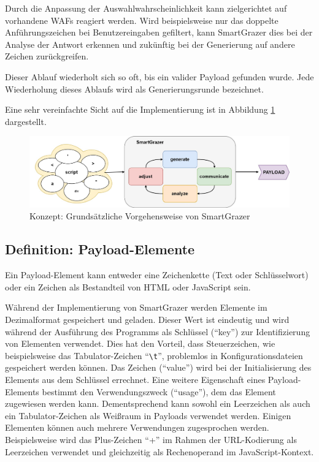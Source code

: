 Durch die Anpassung der Auswahlwahrscheinlichkeit kann zielgerichtet auf vorhandene \acp{WAF} reagiert werden. Wird beispielsweise nur das doppelte Anführungszeichen bei Benutzereingaben gefiltert, kann SmartGrazer dies bei der Analyse der Antwort erkennen und zukünftig bei der Generierung auf andere Zeichen zurückgreifen. 

Dieser Ablauf wiederholt sich so oft, bis ein valider Payload gefunden wurde. Jede Wiederholung dieses Ablaufs wird als Generierungsrunde bezeichnet.

Eine sehr vereinfachte Sicht auf die Implementierung ist in Abbildung \ref{fig:SmartGrazerBirdView} dargestellt.

\begin{figure}[htbp] 
	\centering
	\includegraphics[width=\textwidth]{contents/images/SmartGrazerBirdView}
	\caption{Konzept: Grundsätzliche Vorgehensweise von SmartGrazer}
	\label{fig:SmartGrazerBirdView}
\end{figure}


\subsection{Definition: Payload-Elemente}
Ein Payload-Element kann entweder eine Zeichenkette (Text oder Schlüsselwort) oder ein Zeichen als Bestandteil von HTML oder JavaScript sein.

Während der Implementierung von SmartGrazer werden Elemente im Dezimalformat gespeichert und geladen. Dieser Wert ist eindeutig und wird während der Ausführung des Programms als Schlüssel (``key'') zur Identifizierung von Elementen verwendet. Dies hat den Vorteil, dass Steuerzeichen, wie beispielsweise das Tabulator-Zeichen  ``\lstinline[language=html]!\t!'', problemlos in Konfigurationsdateien gespeichert werden können. Das Zeichen (``value'') wird bei der Initialisierung des Elements aus dem Schlüssel errechnet.
Eine weitere Eigenschaft eines Payload-Elements bestimmt den Verwendungszweck (``usage''), dem das Element zugewiesen werden kann. Dementsprechend kann sowohl ein Leerzeichen als auch ein Tabulator-Zeichen als Weißraum in Payloads verwendet werden. Einigen Elementen können auch mehrere Verwendungen zugesprochen werden.
Beispielsweise wird das Plus-Zeichen ``+'' im Rahmen der URL-Kodierung als Leerzeichen  verwendet und gleichzeitig als Rechenoperand im JavaScript-Kontext.

